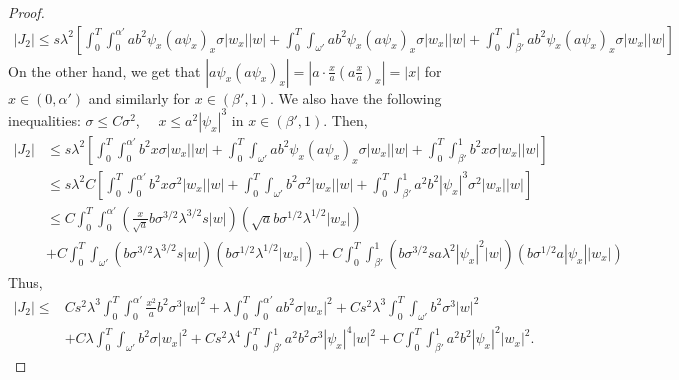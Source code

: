 \documentclass[10pt,a4paper]{amsart}
\begin{document}
\begin{proof}
    \begin{multline*}
    \left|J_2 \right|\leq s\lambda^2\left[\int_0^T \int_0^{\alpha'} ab^2 \psi_x (a\psi_x)_x \sigma |w_x| |w| +  \int_0^T\int_{\omega'} ab^2 \psi_x (a\psi_x)_x \sigma |w_x| |w| + \int_0^T \int_{\beta'}^1 ab^2 \psi_x (a\psi_x)_x \sigma |w_x| |w|\right]
    \end{multline*}
    On the other hand, we get that $\left| a\psi_x (a\psi_x)_x  \right|=\left| a\cdot \frac{x}{a}\left( a\frac{x}{a} \right)_x \right|=|x|$ for $x\in (0,\alpha')$ and similarly for $x\in (\beta',1)$. We also have the following inequalities: $\sigma\leq C\sigma^2$, \ \ $x\leq a^2|\psi_x|^3$ in $x\in (\beta',1)$. Then,
    \begin{equation*}
    \begin{split}
    \left|J_2 \right| &\leq s\lambda^2\left[\int_0^T \int_0^{\alpha'} b^2 x \sigma |w_x| |w| +  \int_0^T\int_{\omega'} ab^2 \psi_x (a\psi_x)_x \sigma |w_x| |w| + \int_0^T \int_{\beta'}^1 b^2 x \sigma |w_x| |w|\right] \\
    &\leq s\lambda^2 C \left[\int_0^T \int_0^{\alpha'} b^2 x \sigma^2 |w_x| |w| +  \int_0^T\int_{\omega'} b^2  \sigma^2 |w_x| |w| + \int_0^T \int_{\beta'}^1 a^2b^2|\psi_x|^3 \sigma^2 |w_x| |w|\right] \\
    &\leq C \int_0^T \int_0^{\alpha'} \left( \frac{x}{\sqrt{a}}b\sigma^{3/2}\lambda^{3/2}s|w|\right)\left( \sqrt{a}b\sigma^{1/2}\lambda^{1/2}|w_x| \right) \\
    &+C\int_0^T\int_{\omega'} \left( b\sigma^{3/2}\lambda^{3/2}s|w|\right)\left( b\sigma^{1/2}\lambda^{1/2}|w_x| \right)
		+C\int_0^T \int_{\beta'}^1\left( b\sigma^{3/2}sa\lambda^2|\psi_x|^2|w|\right)\left( b\sigma^{1/2}a|\psi_x||w_x| \right)
    \end{split}    
    \end{equation*}
    Thus,
    \begin{equation*}
    \begin{split}
        \left|J_2 \right| \leq &Cs^2\lambda^3\int_0^T \int_0^{\alpha'}\frac{x^2}{a}b^2\sigma^3|w|^2+\lambda\int_0^T \int_0^{\alpha'}ab^2\sigma|w_x|^2+Cs^2\lambda^3\int_0^T\int_{\omega'}b^2\sigma^3|w|^2\\
		&+C\lambda \int_0^T\int_{\omega'}b^2\sigma|w_x|^2
		+Cs^2\lambda^4\int_0^T \int_{\beta'}^1a^2b^2\sigma^3|\psi_x|^4|w|^2+C\int_0^T \int_{\beta'}^1a^2b^2|\psi_x|^2|w_x|^2.    
    \end{split}    
    \end{equation*}


\end{proof}
\end{document}
